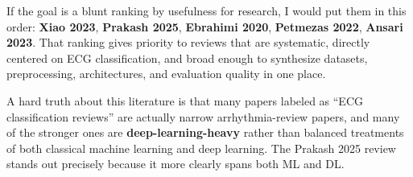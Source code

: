 \documentclass[sigconf,nonacm]{acmart}
\begin{document}
{\begin{enumerate}
\end{enumerate}
If the goal is a blunt ranking by usefulness for research, I would put them in this order: \textbf{Xiao 2023}, \textbf{Prakash 2025}, \textbf{Ebrahimi 2020}, \textbf{Petmezas 2022}, \textbf{Ansari 2023}. That ranking gives priority to reviews that are systematic, directly centered on ECG classification, and broad enough to synthesize datasets, preprocessing, architectures, and evaluation quality in one place.

A hard truth about this literature is that many papers labeled as ``ECG classification reviews'' are actually narrow arrhythmia-review papers, and many of the stronger ones are \textbf{deep-learning-heavy} rather than balanced treatments of both classical machine learning and deep learning. The Prakash 2025 review stands out precisely because it more clearly spans both ML and DL.}

\end{document}
